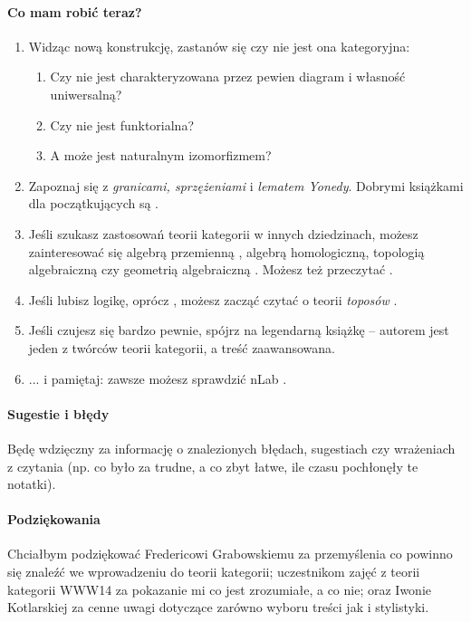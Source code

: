 \paragraph{Co mam robić teraz?}
\begin{enumerate}
  \item Widząc nową konstrukcję, zastanów się czy nie jest ona kategoryjna:
    \begin{enumerate}
      \item Czy nie jest charakteryzowana przez pewien diagram i własność uniwersalną?
      \item Czy nie jest funktorialna?
      \item A może jest naturalnym izomorfizmem?
    \end{enumerate}
  \item Zapoznaj się z \emph{granicami, sprzężeniami} i \emph{lematem Yonedy}. Dobrymi książkami dla początkujących są \cite{Awodey, Baez, Leinster}.
  \item Jeśli szukasz zastosowań teorii kategorii w innych dziedzinach, możesz zainteresować się algebrą przemienną \cite{AtiyahMacdonald}, algebrą homologiczną, topologią algebraiczną \cite{May} czy geometrią algebraiczną \cite{Vakil}. Możesz też przeczytać \cite{Rosetta}.
  \item Jeśli lubisz logikę, oprócz \cite{Rosetta, Awodey}, możesz zacząć czytać o teorii \emph{toposów} \cite{Barr, MacLane_Moerdijk}.
  \item Jeśli czujesz się bardzo pewnie, spójrz na legendarną książkę \cite{MacLane} -- autorem jest jeden z twórców teorii kategorii, a treść zaawansowana.
  \item ... i pamiętaj: zawsze możesz sprawdzić nLab \cite{nLab}.
\end{enumerate}

\paragraph{Sugestie i błędy} Będę wdzięczny za informację o znalezionych błędach, sugestiach czy wrażeniach z czytania (np. co było za trudne, a co zbyt łatwe, ile czasu pochłonęły te notatki).

\paragraph{Podziękowania} Chciałbym podziękować Fredericowi Grabowskiemu za przemyślenia co powinno się znaleźć we wprowadzeniu do teorii kategorii; uczestnikom zajęć z teorii kategorii WWW14 za pokazanie mi co jest zrozumiałe, a co nie; oraz Iwonie Kotlarskiej za cenne uwagi dotyczące zarówno wyboru treści jak i stylistyki.
